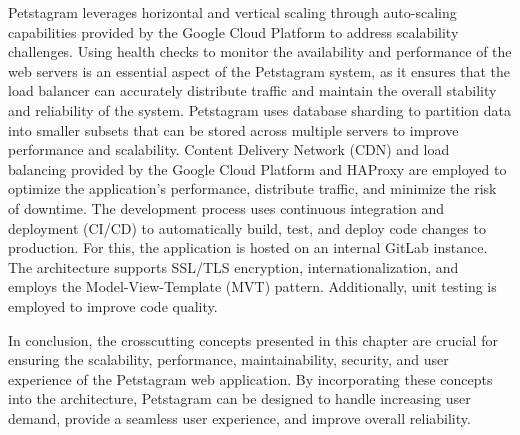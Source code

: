 \documentclass[lettersize,journal]{IEEEtran}
\begin{document}
Petstagram leverages horizontal and vertical scaling through auto-scaling capabilities provided by the Google Cloud Platform to address scalability challenges. Using health checks to monitor the availability and performance of the web servers is an essential aspect of the Petstagram system, as it ensures that the load balancer can accurately distribute traffic and maintain the overall stability and reliability of the system. Petstagram uses database sharding to partition data into smaller subsets that can be stored across multiple servers to improve performance and scalability. Content Delivery Network (CDN) \cite{google_cdn} and load balancing provided by the Google Cloud Platform and HAProxy are employed to optimize the application's performance, distribute traffic, and minimize the risk of downtime. The development process uses continuous integration and deployment (CI/CD) to automatically build, test, and deploy code changes to production. For this, the application is hosted on an internal GitLab instance. The architecture supports SSL/TLS encryption, internationalization, and employs the Model-View-Template (MVT) pattern. Additionally, unit testing is employed to improve code quality.

In conclusion, the crosscutting concepts presented in this chapter are crucial for ensuring the scalability, performance, maintainability, security, and user experience of the Petstagram web application. By incorporating these concepts into the architecture, Petstagram can be designed to handle increasing user demand, provide a seamless user experience, and improve overall reliability.
\end{document}
